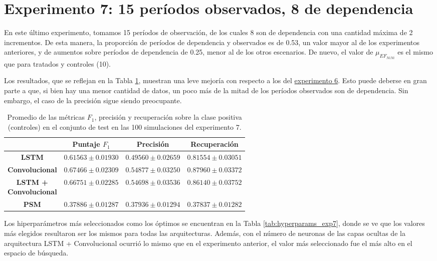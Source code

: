 \documentclass[../../main.tex]{subfiles}
\begin{document}
\section{Experimento 7: 15 períodos observados, 8 de dependencia} \label{sec:exp7}
En este último experimento, tomamos 15 períodos de observación, de los cuales 8 son de
dependencia con una cantidad máxima de 2 incrementos. De esta manera, la proporción de
períodos de dependencia y observados es de 0.53, un valor mayor al de los experimentos
anteriores, y de aumentos sobre períodos de dependencia de 0.25, menor al de los otros
escenarios. De nuevo, el valor de \(\mu_{{EF}_{NiNi}}\) es el mismo que para tratados
y controles (10).

Los resultados, que se reflejan en la Tabla \ref{tab:results_exp7}, muestran una leve
mejoría con respecto a los del \hyperref[sec:exp6]{experimento 6}. Esto puede deberse en
gran parte a que, si bien hay una menor cantidad de datos, un poco más de la mitad de los
períodos observados son de dependencia. Sin embargo, el caso de la precisión sigue siendo
preocupante.

\begin{table}[H]
    \centering
    \renewcommand{\arraystretch}{1.2}
    \label{tab:results_exp7}
    \begin{tabular}{|c|c|c|c|}
        \hline
         & \textbf{Puntaje} \(F_1\) & \textbf{Precisión} & \textbf{Recuperación} \\ \hline\hline
        \textbf{LSTM}
            & $0.61563 \pm 0.01930$ & $0.49560 \pm 0.02659$ & $0.81554 \pm 0.03051$ \\ \hline
        \textbf{Convolucional}
            & $\mathbf{0.67466 \pm 0.02309}$ & $\mathbf{0.54877 \pm 0.03250}$ & $\mathbf{0.87960 \pm 0.03372}$ \\ \hline
        \makecell{\textbf{LSTM +} \\ \textbf{Convolucional}}
            & $0.66751 \pm 0.02285$ & $0.54698 \pm 0.03536$ & $0.86140 \pm 0.03752$ \\ \hline
        \textbf{PSM}
            & $0.37886 \pm 0.01287$ & $0.37936 \pm 0.01294$ & $0.37837 \pm 0.01282$ \\
        \hline
    \end{tabular}
    \caption{Promedio de las métricas \(F_1\), precisión y recuperación sobre la
    clase positiva (controles) en el conjunto de test en las 100 simulaciones del
    experimento 7.}
\end{table}

Los hiperparámetros más seleccionados como los óptimos se encuentran en la Tabla
\ref{tab:hyperparams_exp7}, donde se ve que los valores más elegidos resultaron ser los
mismos para todas las arquitecturas. Además, con el número de neuronas de las capas
ocultas de la arquitectura LSTM + Convolucional ocurrió lo mismo que en el experimento
anterior, el valor más seleccionado fue el más alto en el espacio de búsqueda.
\end{document}
